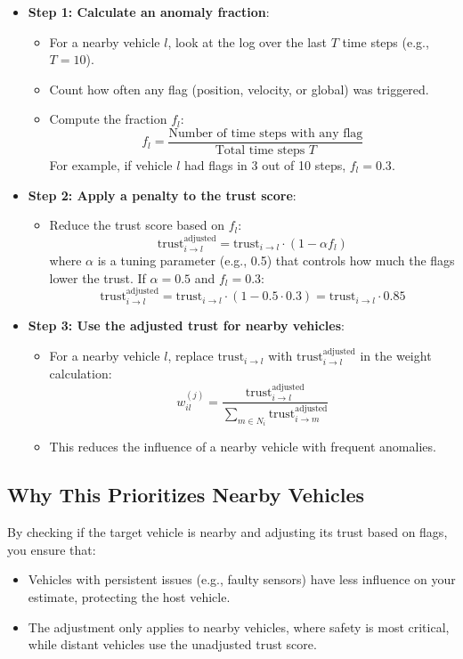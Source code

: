 \documentclass{article}
\begin{document}
\begin{itemize}
    \item \textbf{Step 1: Calculate an anomaly fraction}:
    \begin{itemize}
        \item For a nearby vehicle \( l \), look at the log over the last \( T \) time steps (e.g., \( T = 10 \)).
        \item Count how often any flag (position, velocity, or global) was triggered.
        \item Compute the fraction \( f_l \):
        \[
        f_l = \frac{\text{Number of time steps with any flag}}{\text{Total time steps } T}
        \]
        For example, if vehicle \( l \) had flags in 3 out of 10 steps, \( f_l = 0.3 \).
    \end{itemize}
    
    \item \textbf{Step 2: Apply a penalty to the trust score}:
    \begin{itemize}
        \item Reduce the trust score based on \( f_l \):
        \[
        \text{trust}_{i \to l}^{\text{adjusted}} = \text{trust}_{i \to l} \cdot (1 - \alpha f_l)
        \]
        where \( \alpha \) is a tuning parameter (e.g., 0.5) that controls how much the flags lower the trust. If \( \alpha = 0.5 \) and \( f_l = 0.3 \):
        \[
        \text{trust}_{i \to l}^{\text{adjusted}} = \text{trust}_{i \to l} \cdot (1 - 0.5 \cdot 0.3) = \text{trust}_{i \to l} \cdot 0.85
        \]
    \end{itemize}
    
    \item \textbf{Step 3: Use the adjusted trust for nearby vehicles}:
    \begin{itemize}
        \item For a nearby vehicle \( l \), replace \( \text{trust}_{i \to l} \) with \( \text{trust}_{i \to l}^{\text{adjusted}} \) in the weight calculation:
        \[
        w_{il}^{(j)} = \frac{\text{trust}_{i \to l}^{\text{adjusted}}}{\sum_{m \in N_i} \text{trust}_{i \to m}^{\text{adjusted}}}
        \]
        \item This reduces the influence of a nearby vehicle with frequent anomalies.
    \end{itemize}
\end{itemize}

\subsection{Why This Prioritizes Nearby Vehicles}
By checking if the target vehicle is nearby and adjusting its trust based on flags, you ensure that:
\begin{itemize}
    \item Vehicles with persistent issues (e.g., faulty sensors) have less influence on your estimate, protecting the host vehicle.
    \item The adjustment only applies to nearby vehicles, where safety is most critical, while distant vehicles use the unadjusted trust score.
\end{itemize}
\end{document}
